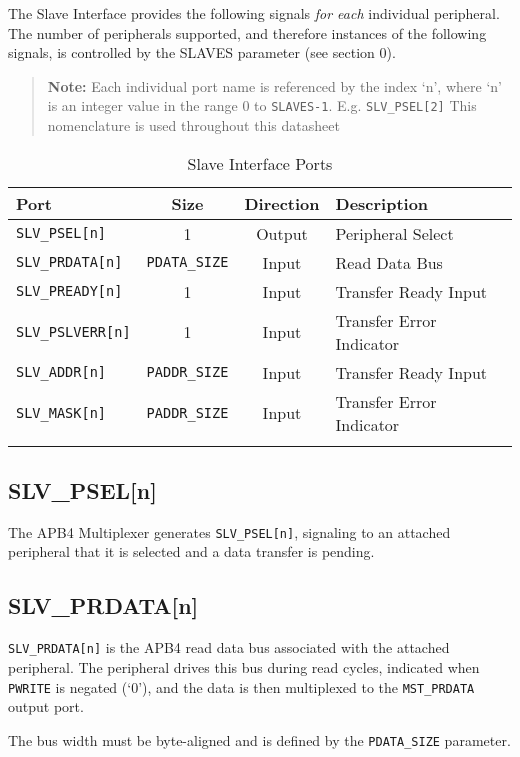 The Slave Interface provides the following signals \emph{for each}
individual peripheral. The number of peripherals supported, and
therefore instances of the following signals, is controlled by the
SLAVES parameter (see section 0).

\begin{quote}
	
	\textbf{Note:} Each individual port name is referenced by the index `n', where `n' is
	an integer value in the range 0 to \texttt{SLAVES-1}. E.g. \texttt{SLV\_PSEL[2]}		
	This nomenclature is used throughout this datasheet
	
\end{quote}

\begin{longtable}[]{@{}lccl@{}}
	\toprule
		Port & Size & Direction & Description\tabularnewline
	\midrule
	\endhead
		\texttt{SLV\_PSEL[n]}    & 1           & Output & Peripheral Select\tabularnewline
		\texttt{SLV\_PRDATA[n]}  & \texttt{PDATA\_SIZE} & Input  & Read Data Bus\tabularnewline
		\texttt{SLV\_PREADY[n]}  & 1           & Input  & Transfer Ready Input\tabularnewline
		\texttt{SLV\_PSLVERR[n]} & 1           & Input  & Transfer Error Indicator\tabularnewline
		\texttt{SLV\_ADDR[n]}    & \texttt{PADDR\_SIZE} & Input  & Transfer Ready Input\tabularnewline
		\texttt{SLV\_MASK[n]}    & \texttt{PADDR\_SIZE} & Input  & Transfer Error Indicator\tabularnewline
	\bottomrule
	\caption{Slave Interface Ports}
\end{longtable}

\subsection{SLV\_PSEL[n]}\label{slv_pseln}

The APB4 Multiplexer generates \texttt{SLV\_PSEL[n]}, signaling to an
attached peripheral that it is selected and a data transfer is pending.

\subsection{SLV\_PRDATA[n]}\label{slv_prdatan}

\texttt{SLV\_PRDATA[n]} is the APB4 read data bus associated with the
attached peripheral. The peripheral drives this bus during read cycles,
indicated when \texttt{PWRITE} is negated (`0'), and the data is then multiplexed
to the \texttt{MST\_PRDATA} output port.

The bus width must be byte-aligned and is defined by the \texttt{PDATA\_SIZE}
parameter.

